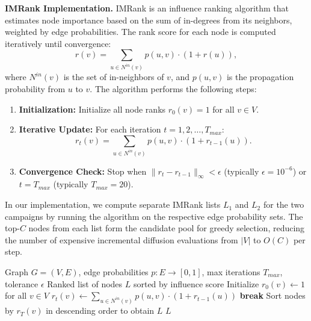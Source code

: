 \documentclass[onecolumn,a4paper,12pt]{IEEEtran}
\begin{document}
\textbf{IMRank Implementation.} IMRank is an influence ranking algorithm that estimates node importance based on the sum of in-degrees from its neighbors, weighted by edge probabilities. The rank score for each node is computed iteratively until convergence:
\begin{equation}
r(v) = \sum_{u \in N^{in}(v)} p(u,v) \cdot \left(1 + r(u)\right),
\end{equation}
where $N^{in}(v)$ is the set of in-neighbors of $v$, and $p(u,v)$ is the propagation probability from $u$ to $v$. The algorithm performs the following steps:
\begin{enumerate}
    \item \textbf{Initialization:} Initialize all node ranks $r_0(v) = 1$ for all $v \in V$.
    \item \textbf{Iterative Update:} For each iteration $t = 1, 2, \ldots, T_{max}$:
    \begin{equation}
    r_t(v) = \sum_{u \in N^{in}(v)} p(u,v) \cdot \left(1 + r_{t-1}(u)\right).
    \end{equation}
    \item \textbf{Convergence Check:} Stop when $\|r_t - r_{t-1}\|_\infty < \epsilon$ (typically $\epsilon = 10^{-6}$) or $t = T_{max}$ (typically $T_{max} = 20$).
\end{enumerate}

In our implementation, we compute separate IMRank lists $L_1$ and $L_2$ for the two campaigns by running the algorithm on the respective edge probability sets. The top-$C$ nodes from each list form the candidate pool for greedy selection, reducing the number of expensive incremental diffusion evaluations from $|V|$ to $O(C)$ per step.

\begin{algorithm}[h]
\caption{IMRank Influence Ranking}
\label{alg:imrank}
\begin{algorithmic}[1]
\Require Graph $G=(V,E)$, edge probabilities $p: E \to [0,1]$, max iterations $T_{max}$, tolerance $\epsilon$
\Ensure Ranked list of nodes $L$ sorted by influence score
\State Initialize $r_0(v) \gets 1$ for all $v \in V$
        \State $r_t(v) \gets \sum_{u \in N^{in}(v)} p(u,v) \cdot (1 + r_{t-1}(u))$
    \EndFor
        \State \textbf{break} 
    \EndIf
\EndFor
\State Sort nodes by $r_T(v)$ in descending order to obtain $L$
\State \Return $L$
\end{algorithmic}
\end{algorithm}
\end{document}
